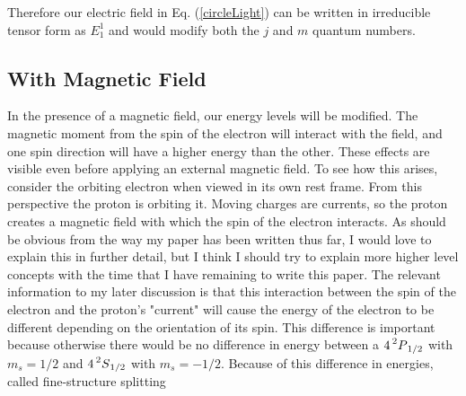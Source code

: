 \documentclass[12pt]{article}
\begin{document}
		Therefore our electric field in Eq. (\ref{circleLight}) can
		be written in irreducible tensor form as $E^{1}_1$ and 
		would modify both the $j$ and $m$ 
		quantum numbers.
\subsection{With Magnetic Field}
	In the presence of a magnetic field, our energy levels will be modified.
	The magnetic moment from the spin of the electron will interact
	with the field, and one spin direction will have a 
	higher energy than the other. These effects are
	visible even before applying an external 
	magnetic field. To see how this arises, 
	consider the orbiting electron
	when viewed in its own rest frame. From this
	perspective the  
	proton is orbiting it. Moving charges
	are currents, so the proton creates a
	magnetic field with which the spin of the electron 
	interacts. As should be obvious from the way my paper
	has been written thus far, I would love to explain this
	in further detail, but I think I should try to explain
	more higher level concepts with the time that I have
	remaining to write this paper. 
	The relevant information to my later discussion
	is that this interaction between the spin of the 
	electron and the proton's "current" will cause
	the energy of the electron to be different depending
	on the orientation of its spin. This difference is 
	important because otherwise there would be no difference
	in energy between a $4\prescript{2}{}P_{1/2}$ with 
	$m_s=1/2$ and $4\prescript{2}{}S_{1/2}$ with $m_s=-1/2$.
	Because of this difference in energies, called fine-structure
	splitting

%
\end{document}
